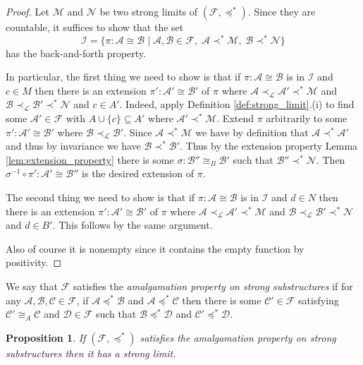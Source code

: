 \documentclass[12pt]{amsart}
\theoremstyle{plain}
\newtheorem{proposition}[theorem]{Proposition}
\theoremstyle{definition}
\newcommand{\isom}{\cong}
\newcommand{\mcA}{\mathcal{A}}
\newcommand{\mcB}{\mathcal{B}}
\newcommand{\mcC}{\mathcal{C}}
\newcommand{\mcD}{\mathcal{D}}
\newcommand{\mcF}{\mathcal{F}}
\newcommand{\mcI}{\mathcal{I}}
\newcommand{\mcL}{\mathcal{L}}
\newcommand{\mcM}{\mathcal{M}}
\newcommand{\mcN}{\mathcal{N}}
\begin{document}
\begin{proof}
Let $\mcM$ and $\mcN$ be two strong limits of $(\mcF, \preceq^*)$.
Since they are countable, it suffices to show that the set
\[ \mcI = \{\pi : \mcA \isom \mcB \mid \mcA, \mcB \in \mcF, \; \mcA \prec^* \mcM, \; \mcB \prec^* \mcN\}\]
has the back-and-forth property.

In particular, the first thing we need to show is that if $\pi : \mcA \isom \mcB$ is in $\mcI$ and $c \in M$ then there is an extension $\pi' : \mcA' \isom \mcB'$ of $\pi$ where $\mcA \prec_\mcL \mcA' \prec^* \mcM$ and $\mcB \prec_\mcL \mcB' \prec^* \mcN$ and $c \in A'$.
Indeed, apply Definition \ref{def:strong_limit}.(i) to find some $\mcA' \in \mcF$ with $A \cup \{c\} \subseteq A'$ where $\mcA' \prec^* \mcM$.
Extend $\pi$ arbitrarily to some $\pi' : \mcA' \isom \mcB'$ where $\mcB \prec_\mcL \mcB'$.
Since $\mcA \prec^* \mcM$ we have by definition that $\mcA \prec^* \mcA'$ and thus by invariance we have $\mcB \prec^* \mcB'$.
Thus by the extension property Lemma \ref{lem:extension_property} there is some $\sigma : \mcB'' \isom_B \mcB'$ such that $\mcB'' \prec^* \mcN$.
Then $\sigma^{-1} \circ \pi' : \mcA' \isom \mcB''$ is the desired extension of $\pi$.

The second thing we need to show is that if $\pi : \mcA \isom \mcB$ is in $\mcI$ and $d \in N$ then there is an extension $\pi' : \mcA' \isom \mcB'$ of $\pi$ where $\mcA \prec_\mcL \mcA' \prec^* \mcM$ and $\mcB \prec_\mcL \mcB' \prec^* \mcN$ and $d \in B'$.
This follows by the same argument.

Also of course it is nonempty since it contains the empty function by positivity.
\end{proof}

We say that $\mcF$ satisfies the \emph{amalgamation property on strong substructures} if for any $\mcA, \mcB, \mcC \in \mcF$, if $\mcA \preceq^* \mcB$ and $\mcA \preceq^* \mcC$ then there is some $\mcC' \in \mcF$ satisfying $\mcC' \isom_A \mcC$ and $\mcD \in \mcF$ such that $\mcB \preceq^* \mcD$ and $\mcC' \preceq^* \mcD$.

\begin{proposition}\label{prop:exists_limit}
If $(\mcF, \preceq^*)$ satisfies the amalgamation property on strong substructures then it has a strong limit.
\end{proposition}
\end{document}
